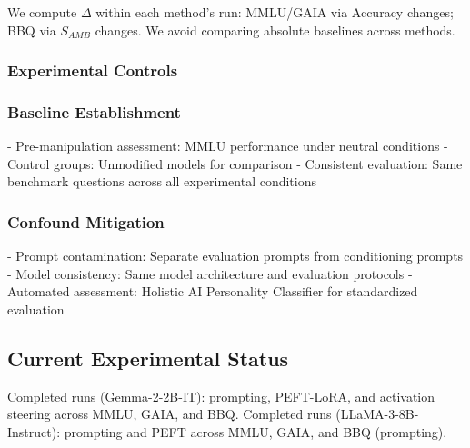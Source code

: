 We compute \(\Delta\) within each method's run: MMLU/GAIA via Accuracy changes; BBQ via \(S_{AMB}\) changes. We avoid comparing absolute baselines across methods.

\subsubsection{Experimental Controls}

\subsubsection{Baseline Establishment}
- Pre-manipulation assessment: MMLU performance under neutral conditions
- Control groups: Unmodified models for comparison
- Consistent evaluation: Same benchmark questions across all experimental conditions

\subsubsection{Confound Mitigation}
- Prompt contamination: Separate evaluation prompts from conditioning prompts
- Model consistency: Same model architecture and evaluation protocols
- Automated assessment: Holistic AI Personality Classifier for standardized evaluation

\subsection{Current Experimental Status}

Completed runs (Gemma-2-2B-IT): prompting, PEFT-LoRA, and activation steering across MMLU, GAIA, and BBQ. Completed runs (LLaMA-3-8B-Instruct): prompting and PEFT across MMLU, GAIA, and BBQ (prompting).

